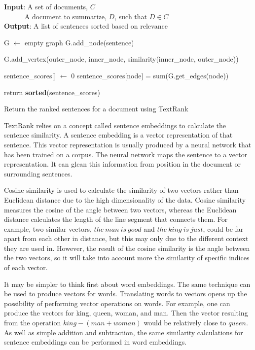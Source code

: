 \documentclass{article}[10]
\begin{document}
\begin{algorithm}[ht]
    \hspace*{6px} \textbf{Input}: A set of documents, $C$ \\
    \hspace*{6px} $\:\:\:\:\:\:\:\:\:\:\:\:$ A document to summarize, $D$, such that $D\in C$ \\
    \hspace*{6px} \textbf{Output}: A list of sentences sorted based on relevance

    G $\leftarrow$ empty graph \;
    {
        G.add\_node(sentence)\;
    }

    {
        {
            G.add\_vertex(outer\_node, inner\_node, similarity(inner\_node, outer\_node))\;
        }
    }

    sentence\_scores[] $\leftarrow$ 0\;
    {
        sentence\_scores[node] = sum(G.get\_edges(node))\;
    }

    return \textbf{sorted}(sentence\_scores)
    \caption{Return the ranked sentences for a document using TextRank}\label{algo-tr}
\end{algorithm}

TextRank relies on a concept called sentence embeddings to calculate the sentence similarity. A sentence embedding is a vector representation of that sentence. This vector representation is usually produced by a neural network that has been trained on a corpus. The neural network maps the sentence to a vector representation. It can glean this information from position in the document or surrounding sentences.

Cosine similarity is used to calculate the similarity of two vectors rather than Euclidean distance due to the high dimensionality of the data. Cosine similarity measures the cosine of the angle between two vectors, whereas the Euclidean distance calculates the length of the line segment that connects them. For example, two similar vectors, $the\:man\:is\:good$ and $the\:king\:is\:just$, could be far apart from each other in distance, but this may only due to the different context they are used in. However, the result of the cosine similarity is the angle between the two vectors, so it will take into account more the similarity of specific indices of each vector.

It may be simpler to think first about word embeddings. The same technique can be used to produce vectors for words. Translating words to vectors opens up the possibility of performing vector operations on words. For example, one can produce the vectors for king, queen, woman, and man. Then the vector resulting from the operation $king - (man + woman)$ would be relatively close to $queen$. As well as simple addition and subtraction, the same similarity calculations for sentence embeddings can be performed in word embeddings.
\end{document}
